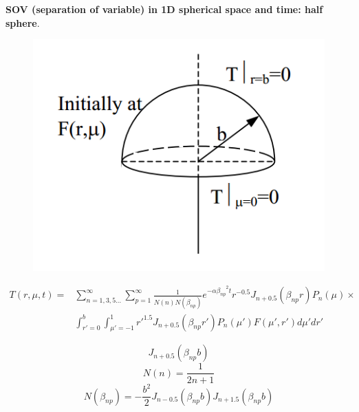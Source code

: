 \begin{example}
\textbf{SOV (separation of variable) in 1D spherical space and time: half sphere}. 
\begin{figure}[H]
  \centering
    \includegraphics[scale=0.5]{figures/appendixA/8}
\end{figure}
\begin{equation*}
\begin{aligned}
T(r,\mu,t)=&\sum_{n=1,3,5\dots}^{\infty}\sum_{p=1}^{\infty} \frac{1}{N(n)N(\beta_{np})}
e^{-\alpha{\beta_{np}}^2t}r^{-0.5}J_{n+0.5}(\beta_{np}r)P_n(\mu)\times\\
&\int_{r'=0}^{b}\int_{\mu'=-1}^{1} {r'}^{1.5}J_{n+0.5}(\beta_{np}r')P_n(\mu')
F(\mu',r')d\mu'dr'
\end{aligned}
\end{equation*}

$$J_{n+0.5}(\beta_{np}b)$$
$$N(n)=\frac{1}{2n+1}$$
$$N(\beta_{np})=-\frac{b^2}{2}J_{n-0.5}(\beta_{np}b)J_{n+1.5}(\beta_{np}b)$$
\end{example}


